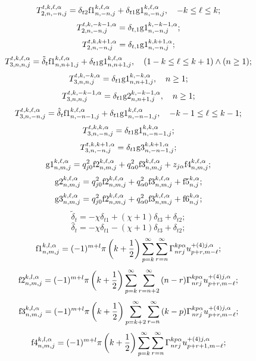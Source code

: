 \begin{theorem}
\[T_{2,n, - n,j}^{t,k,\ell ,\alpha } = {\delta _{t2}}{\rm{f1}}_{n, - n,j}^{k,\ell ,\alpha } + {\delta _{t1}}{\rm g1}_{n, - n,j}^{k,\ell ,\alpha },\quad - k \le \ell  \le k;\]
\[T_{2,n, - n,j}^{t,k,-k-1,\alpha } =  {\delta _{t,1}}{\rm g1}_{n, - n,j}^{k,-k-1,\alpha };\]
\[T_{2,n, - n,j}^{t,k,k + 1,\alpha } =  {\delta _{t,1}}{\rm g1}_{n, - n,j}^{k,k + 1,\alpha };\]
\[T_{3,n,n,j}^{t,k,\ell ,\alpha } = {\tilde \delta _t}{\rm{f1}}_{n,n + 1,j}^{k,\ell ,\alpha } + {\delta _{t1}}{\rm g1}_{n,n + 1,j}^{k,\ell ,\alpha },\quad (1 - k \le \ell  \le k + 1) \wedge (n \ge 1);\]
\[T_{3,n,n,j}^{t,k, - k,\alpha } = {\delta _{t1}}{\rm g1}_{n,n + 1,j}^{k, - k,\alpha },\quad n\ge 1;\]
\[T_{3,n,n,j}^{t,k, - k - 1,\alpha } = {\delta _{t1}}{\rm g2}_{n,n + 1,j}^{k, - k - 1,\alpha },\quad n\ge 1;\]
\[T_{3,n, - n,j}^{t,k,\ell ,\alpha } = {\hat \delta _t}{\rm{f1}}_{n, - n - 1,j}^{k,\ell ,\alpha } + {\delta _{t1}}{\rm g1}_{n, - n - 1,j}^{k,\ell ,\alpha },\quad - k - 1 \le \ell  \le k - 1;\]
\[T_{3,n, - n,j}^{t,k,k,\alpha } = {\delta _{t1}}{\rm g1}_{n, - n - 1,j}^{k,k,\alpha };\]
\[T_{3,n, - n,j}^{t,k,k + 1,\alpha } = {\delta _{t1}}{\rm g3}_{n, - n - 1,j}^{k,k + 1,\alpha };\]
\[{\rm g1}_{n,m,j}^{k,\ell ,\alpha } = {{q}}_{j0}^2{\rm{f2}}_{n,m,j}^{k,\ell ,\alpha } + {{q}}_{\alpha 0}^2{\rm{f3}}_{n,m,j}^{k,\ell ,\alpha } + {{{z}}_{{{j}}\alpha }}{\rm{f4}}_{n,m,j}^{k,\ell ,\alpha };\]
\[{\rm g2}_{n,m,j}^{k,\ell ,\alpha } = {{q}}_{j0}^2{\rm{f2}}_{n,m,j}^{k,\ell ,\alpha } + {{q}}_{\alpha 0}^2{\rm{f3}}_{n,m,j}^{k,\ell ,\alpha } + {\rm{f5}}_{n,j}^{k,\alpha };\]
\[{\rm g3}_{n,m,j}^{k,\ell ,\alpha } = {{q}}_{j0}^2{\rm{f2}}_{n,m,j}^{k,\ell ,\alpha } + {{q}}_{\alpha 0}^2{\rm{f3}}_{n,m,j}^{k,\ell ,\alpha } + {\rm{f6}}_{n,j}^{k,\alpha };\]
\[{\tilde \delta _t} =  - \chi {\delta _{t1}} + (\chi  + 1){\delta _{t3}} + {\delta _{t2}};\]
\[{\hat \delta _t} =  - \chi {\delta _{t1}} - (\chi  + 1){\delta _{t3}} + {\delta _{t2}};\]
\[{\rm{f1}}_{n,m,j}^{k,l,\alpha } = (-1)^{m+l}\pi \left( {k + \frac{1}{2}} \right)\sum\limits_{p = k}^\infty  {\sum\limits_{r = n}^\infty  {\Gamma _{nrj}^{kp\alpha }{u}_{p + r,m - \ell }^{ + (4)j,\alpha }} };\]
\[{\rm{f2}}_{n,m,j}^{k,l,\alpha } = (-1)^{m+l}\pi \left( {k + \frac{1}{2}} \right)\sum\limits_{p = k}^\infty  {\sum\limits_{r = n + 2}^\infty  {(n - r)\Gamma _{nrj}^{kp\alpha }{u}_{p + r,m - \ell }^{ + (4)j,\alpha }} };\]
\[{\rm{f3}}_{n,m,j}^{k,l,\alpha } = (-1)^{m+l}\pi \left( {k + \frac{1}{2}} \right)\sum\limits_{p = k + 2}^\infty  {\sum\limits_{r = n}^\infty  {(k - p)\Gamma _{nrj}^{kp\alpha }{u}_{p + r,m - \ell }^{ + (4)j,\alpha }} };\]
\[{\rm{f4}}_{n,m,j}^{k,l,\alpha } = (-1)^{m+l}\pi \left( {k + \frac{1}{2}} \right)\sum\limits_{p = k}^\infty  {\sum\limits_{r = n}^\infty  {\Gamma _{nrj}^{kp\alpha }{u}_{p + r + 1,m - \ell }^{ + (4)j,\alpha }} };\]

\end{theorem}
